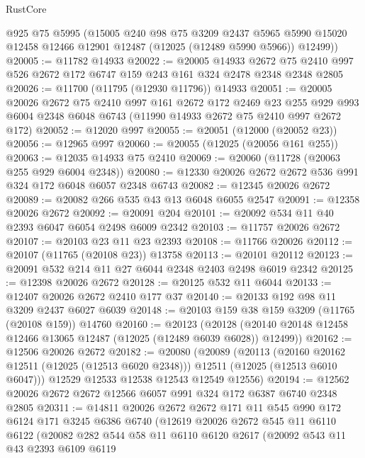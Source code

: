\begin{lexlean}{RustCore}
\begin{coremodule}
      @925
      @75
      @5995
      (@15005
        @240
        @98
        @75
        @3209
        @2437
        @5965
        @5990
        @15020
        @12458
        @12466
        @12901
        @12487
        (@12025 (@12489 @5990 @5966))
        @12499))
@20005 := @11782 @14933
@20022 := @20005
    @14933
    @2672
    @75
    @2410
    @997
    @526
    @2672
    @172
    @6747
    @159
    @243
    @161
    @324
    @2478
    @2348
    @2348
    @2805
@20026 := @11700 (@11795 (@12930 @11796)) @14933
@20051 := @20005
    @20026
    @2672
    @75
    @2410
    @997
    @161
    @2672
    @172
    @2469
    @23
    @255
    @929
    @993
    @6004
    @2348
    @6048
    @6743
    (@11990 @14933 @2672 @75 @2410 @997 @2672 @172)
@20052 := @12020 @997
@20055 := @20051 (@12000 (@20052 @23))
@20056 := @12965 @997
@20060 := @20055 (@12025 (@20056 @161 @255))
@20063 := @12035 @14933 @75 @2410
@20069 := @20060 (@11728 (@20063 @255 @929 @6004 @2348))
@20080 := @12330 @20026 @2672 @2672 @536 @991 @324 @172 @6048 @6057 @2348 @6743
@20082 := @12345 @20026 @2672
@20089 := @20082 @266 @535 @43 @13 @6048 @6055 @2547
@20091 := @12358 @20026 @2672
@20092 := @20091 @204
@20101 := @20092 @534 @11 @40 @2393 @6047 @6054 @2498 @6009 @2342
@20103 := @11757 @20026 @2672
@20107 := @20103 @23 @11 @23 @2393
@20108 := @11766 @20026
@20112 := @20107 (@11765 (@20108 @23)) @13758
@20113 := @20101 @20112
@20123 := @20091 @532 @214 @11 @27 @6044 @2348 @2403 @2498 @6019 @2342
@20125 := @12398 @20026 @2672
@20128 := @20125 @532 @11 @6044
@20133 := @12407 @20026 @2672 @2410 @177 @37
@20140 := @20133 @192 @98 @11 @3209 @2437 @6027 @6039
@20148 := @20103 @159 @38 @159 @3209 (@11765 (@20108 @159)) @14760
@20160 := @20123
    (@20128 (@20140 @20148 @12458 @12466 @13065 @12487 (@12025 (@12489 @6039 @6028)) @12499))
@20162 := @12506 @20026 @2672
@20182 := @20080
    (@20089
      (@20113
        (@20160 @20162 @12511 (@12025 (@12513 @6020 @2348)))
        @12511
        (@12025 (@12513 @6010 @6047)))
      @12529
      @12533
      @12538
      @12543
      @12549
      @12556)
@20194 := @12562 @20026 @2672 @2672 @12566 @6057 @991 @324 @172 @6387 @6740 @2348 @2805
@20311 := @14811
    @20026
    @2672
    @2672
    @171
    @11
    @545
    @990
    @172
    @6124
    @171
    @3245
    @6386
    @6740
    (@12619
      @20026
      @2672
      @545
      @11
      @6110
      @6122
      (@20082
        @282
        @544
        @58
        @11
        @6110
        @6120
        @2617
        (@20092
          @543
          @11
          @43
          @2393
          @6109
          @6119

\end{coremodule}
\end{lexlean}
